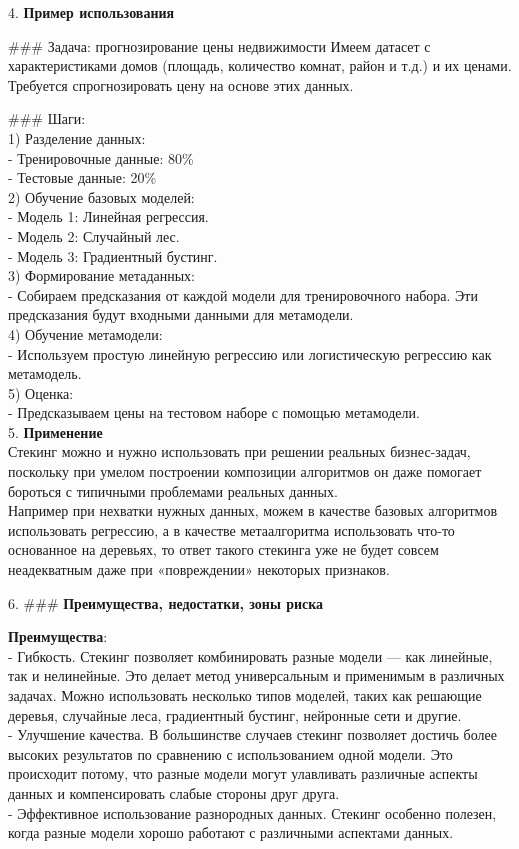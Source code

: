 4. \textbf{Пример использования}

### Задача: прогнозирование цены недвижимости  
Имеем датасет с характеристиками домов (площадь, количество комнат, район и т.д.) и их ценами. Требуется спрогнозировать цену на основе этих данных.  

### Шаги:  \\
1) Разделение данных:  \\
   - Тренировочные данные: 80\%  \\
   - Тестовые данные: 20\% \\
2) Обучение базовых моделей:\\
   - Модель 1: Линейная регрессия.  \\
   - Модель 2: Случайный лес.  \\
   - Модель 3: Градиентный бустинг.  \\
3) Формирование метаданных:\\ 
   - Собираем предсказания от каждой модели для тренировочного набора. Эти предсказания будут входными данными для метамодели.  \\
4) Обучение метамодели: \\
   - Используем простую линейную регрессию или логистическую регрессию как метамодель.  \\
5) Оценка:\\
   - Предсказываем цены на тестовом наборе с помощью метамодели.  \\

5. \textbf{Применение}\\
Стекинг можно и нужно использовать при решении реальных бизнес-задач, поскольку при умелом построении композиции алгоритмов он даже помогает бороться с типичными проблемами реальных данных. \\
Например при нехватки нужных данных, можем в качестве базовых алгоритмов использовать регрессию, а в качестве метаалгоритма использовать что-то основанное на деревьях, то ответ такого стекинга уже не будет совсем неадекватным даже при «повреждении» некоторых признаков.

6. ### \textbf{Преимущества, недостатки, зоны риска}

\textbf{Преимущества}:\\
- Гибкость. Стекинг позволяет комбинировать разные модели — как линейные, так и нелинейные. Это делает метод универсальным и применимым в различных задачах. Можно использовать несколько типов моделей, таких как решающие деревья, случайные леса, градиентный бустинг, нейронные сети и другие.\\
- Улучшение качества. В большинстве случаев стекинг позволяет достичь более высоких результатов по сравнению с использованием одной модели. Это происходит потому, что разные модели могут улавливать различные аспекты данных и компенсировать слабые стороны друг друга.\\
- Эффективное использование разнородных данных. Стекинг особенно полезен, когда разные модели хорошо работают с различными аспектами данных. \\
  

